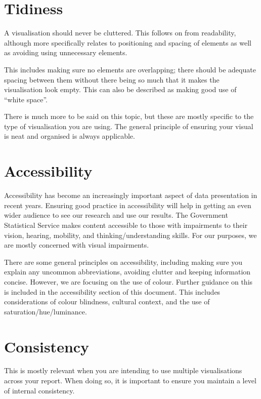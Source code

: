\documentclass[
]{book}
\begin{document}
\hypertarget{tidiness}{%
\section{Tidiness}\label{tidiness}}

A visualisation should never be cluttered. This follows on from readability, although more specifically relates to positioning and spacing of elements as well as avoiding using unnecessary elements.

This includes making sure no elements are overlapping; there should be adequate spacing between them without there being so much that it makes the visualisation look empty. This can also be described as making good use of ``white space''.

There is much more to be said on this topic, but these are mostly specific to the type of visualisation you are using. The general principle of ensuring your visual is neat and organised is always applicable.

\hypertarget{accessibility}{%
\section{Accessibility}\label{accessibility}}

Accessibility has become an increasingly important aspect of data presentation in recent years. Ensuring good practice in accessibility will help in getting an even wider audience to see our research and use our results. The Government Statistical Service makes content accessible to those with impairments to their vision, hearing, mobility, and thinking/understanding skills. For our purposes, we are mostly concerned with visual impairments.

There are some general principles on accessibility, including making sure you explain any uncommon abbreviations, avoiding clutter and keeping information concise. However, we are focusing on the use of colour. Further guidance on this is included in the accessibility section of this document. This includes considerations of colour blindness, cultural context, and the use of saturation/hue/luminance.

\hypertarget{consistency}{%
\section{Consistency}\label{consistency}}

This is mostly relevant when you are intending to use multiple visualisations across your report. When doing so, it is important to ensure you maintain a level of internal consistency.
\end{document}
